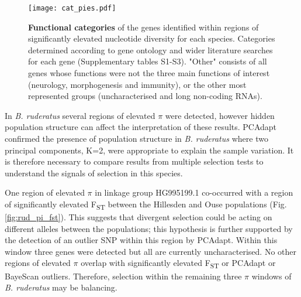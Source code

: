 \documentclass[12pt]{article}
\begin{document}
\begin{linenumbers}
	\begin{figure}[ht!]
		\centering
		\texttt{[image: cat\_pies.pdf]}
		\captionsetup{width=0.88\linewidth}
		\caption{\textbf{Functional categories} of the genes identified within regions of significantly elevated nucleotide diversity for each species. Categories determined according to gene ontology and wider literature searches for each gene (Supplementary tables S1-S3). "Other" consists of all genes whose functions were not the three main functions of interest (neurology, morphogenesis and immunity), or the other most represented groups (uncharacterised and long non-coding RNAs).}
		\label{fig:cat_pies}
	\end{figure}


	In \emph{B. ruderatus} several regions of elevated $\pi$ were detected, however hidden population structure can affect the interpretation of these results. PCAdapt confirmed the presence of population structure in \emph{B. ruderatus} where two principal components, K=2, were appropriate to explain the sample variation. It is therefore necessary to compare results from multiple selection tests to understand the signals of selection in this species.
		
	One region of elevated $\pi$ in linkage group HG995199.1 co-occurred with a region of significantly elevated F\textsubscript{ST} between the Hillesden and Ouse populations (Fig. \ref{fig:rud_pi_fst}). This suggests that divergent selection could be acting on different alleles between the populations; this hypothesis is further supported by the detection of an outlier SNP within this region by PCAdapt. Within this window three genes were detected but all are currently uncharacterised. No other regions of elevated $\pi$ overlap with significantly elevated F\textsubscript{ST} or PCAdapt or BayeScan outliers. Therefore, selection within the remaining three $\pi$ windows of \emph{B. ruderatus} may be balancing. 
		

\end{linenumbers}
\end{document}
